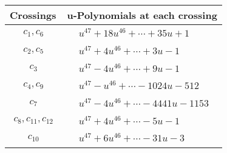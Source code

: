 \documentclass[1p]{elsarticle_modified}
\theoremstyle{definition}
\begin{document}
\begin{tabular}{m{50pt}|m{274pt}}
Crossings & \hspace{64pt}u-Polynomials at each crossing \\
\hline $$\begin{aligned}c_{1},c_{6}\end{aligned}$$&$\begin{aligned}
&u^{47}+18 u^{46}+\cdots+35 u+1
\end{aligned}$\\
\hline $$\begin{aligned}c_{2},c_{5}\end{aligned}$$&$\begin{aligned}
&u^{47}+4 u^{46}+\cdots+3 u-1
\end{aligned}$\\
\hline $$\begin{aligned}c_{3}\end{aligned}$$&$\begin{aligned}
&u^{47}-4 u^{46}+\cdots+9 u-1
\end{aligned}$\\
\hline $$\begin{aligned}c_{4},c_{9}\end{aligned}$$&$\begin{aligned}
&u^{47}- u^{46}+\cdots-1024 u-512
\end{aligned}$\\
\hline $$\begin{aligned}c_{7}\end{aligned}$$&$\begin{aligned}
&u^{47}-4 u^{46}+\cdots-4441 u-1153
\end{aligned}$\\
\hline $$\begin{aligned}c_{8},c_{11},c_{12}\end{aligned}$$&$\begin{aligned}
&u^{47}+4 u^{46}+\cdots-5 u-1
\end{aligned}$\\
\hline $$\begin{aligned}c_{10}\end{aligned}$$&$\begin{aligned}
&u^{47}+6 u^{46}+\cdots-31 u-3
\end{aligned}$\\
\hline
\end{tabular}\\~\\
\newpage\renewcommand{\arraystretch}{1}
\end{document}
